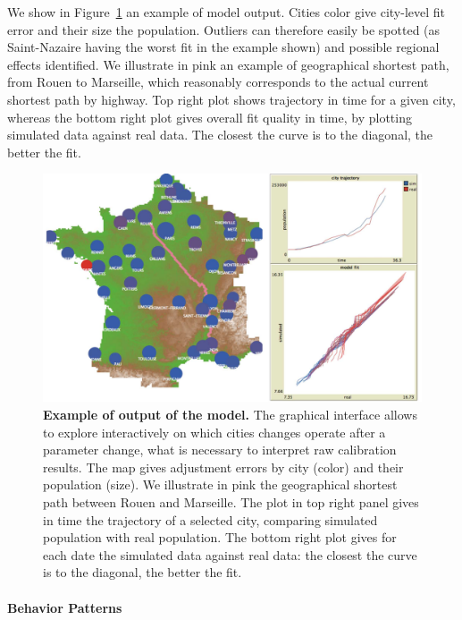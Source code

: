 \documentclass{article}
\begin{document}
We show in Figure~\ref{fig:interface} an example of model output. Cities color give city-level fit error and their size the population. Outliers can therefore easily be spotted (as Saint-Nazaire having the worst fit in the example shown) and possible regional effects identified. We illustrate in pink an example of geographical shortest path, from Rouen to Marseille, which reasonably corresponds to the actual current shortest path by highway. Top right plot shows trajectory in time for a given city, whereas the bottom right plot gives overall fit quality in time, by plotting simulated data against real data. The closest the curve is to the diagonal, the better the fit.


\begin{figure}
\centering
\includegraphics[width=\textwidth]{Fig2.jpg}
\caption{\textbf{Example of output of the model.} The graphical interface allows to explore interactively on which cities changes operate after a parameter change, what is necessary to interpret raw calibration results. The map gives adjustment errors by city (color) and their population (size). We illustrate in pink the geographical shortest path between Rouen and Marseille. The plot in top right panel gives in time the trajectory of a selected city, comparing simulated population with real population. The bottom right plot gives for each date the simulated data against real data: the closest the curve is to the diagonal, the better the fit.}
\label{fig:interface}
\end{figure}


\paragraph{Behavior Patterns}
\end{document}
